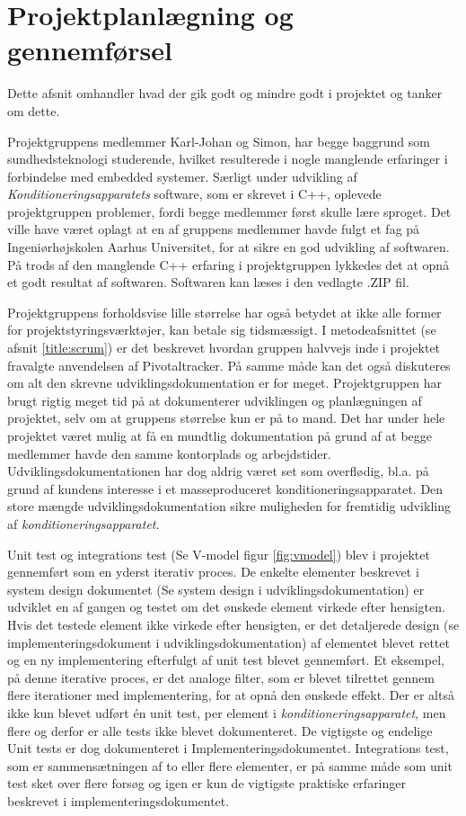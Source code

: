 \section{Projektplanlægning og gennemførsel}
Dette afsnit omhandler hvad der gik godt og mindre godt i projektet og tanker om dette.

Projektgruppens medlemmer Karl-Johan og Simon, har begge baggrund som sundhedsteknologi studerende, hvilket resulterede i nogle manglende erfaringer i forbindelse med embedded systemer. Særligt under udvikling af \textit{Konditioneringsapparatets} software, som er skrevet i C++, oplevede projektgruppen problemer, fordi begge medlemmer først skulle lære sproget. Det ville have været oplagt at en af gruppens medlemmer havde fulgt et fag på Ingeniørhøjskolen Aarhus Universitet, for at sikre en god udvikling af softwaren. På trods af den manglende C++ erfaring i projektgruppen lykkedes det at opnå et godt resultat af softwaren. Softwaren kan læses i den vedlagte .ZIP fil.

Projektgruppens forholdsvise lille størrelse har også betydet at ikke alle former for projektstyringsværktøjer, kan betale sig tidsmæssigt. I metodeafsnittet (se afsnit \ref{title:scrum}) er det beskrevet hvordan gruppen halvvejs inde i projektet fravalgte anvendelsen af Pivotaltracker. På samme måde kan det også diskuteres om alt den skrevne udviklingsdokumentation er for meget. Projektgruppen har brugt rigtig meget tid på at dokumenterer udviklingen og planlægningen af projektet, selv om at gruppens størrelse kun er på to mand. Det har under hele projektet været mulig at få en mundtlig dokumentation på grund af at begge medlemmer havde den samme kontorplads og arbejdstider.
Udviklingsdokumentationen har dog aldrig været set som overflødig, bl.a. på grund af kundens interesse i et masseproduceret konditioneringsapparatet. Den store mængde udviklingsdokumentation sikre muligheden for fremtidig udvikling af \textit{konditioneringsapparatet}. 

Unit test og integrations test (Se V-model figur \ref{fig:vmodel}) blev i projektet gennemført som en yderst iterativ proces. De enkelte elementer beskrevet i system design dokumentet (Se system design i udviklingsdokumentation) er udviklet en af gangen og testet om det ønskede element virkede efter hensigten. Hvis det testede element ikke virkede efter hensigten, er det detaljerede design (se implementeringsdokument i udviklingsdokumentation) af elementet blevet rettet og en ny implementering efterfulgt af unit test blevet gennemført. Et eksempel, på denne iterative proces, er det analoge filter, som er blevet tilrettet gennem flere iterationer med implementering, for at opnå den ønskede effekt. Der er altså ikke kun blevet udført én unit test, per element i \textit{konditioneringsapparatet}, men flere og derfor er alle tests ikke blevet dokumenteret. De vigtigste og endelige Unit tests er dog dokumenteret i Implementeringsdokumentet. Integrations test, som er sammensætningen af to eller flere elementer, er på samme måde som unit test sket over flere forsøg og igen er kun de vigtigste praktiske erfaringer beskrevet i implementeringsdokumentet.

